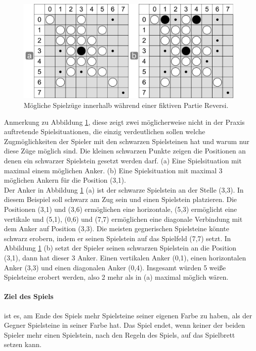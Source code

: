 \begin{figure}[!htbp]
  \centering
  \includegraphics[scale=0.5]{inhalt/abbildungen/zuege_schwarz_reversi.pdf}
  \caption{Mögliche Spielzüge innerhalb während einer fiktiven Partie Reversi.}
  \label{fig:zuege_schwarz_reversi}
\end{figure}

Anmerkung zu Abbildung \ref{fig:zuege_schwarz_reversi}, diese zeigt zwei möglicherweise nicht in der Praxis auftretende Spielsituationen, die einzig verdeutlichen sollen welche Zugmöglichkeiten der Spieler mit den schwarzen Spielsteinen hat und warum nur diese Züge möglich sind. Die kleinen schwarzen Punkte zeigen die Positionen an denen ein schwarzer Spielstein gesetzt werden darf. (a) Eine Spielsituation mit maximal einem möglichen Anker. (b) Eine Spielsituation mit maximal 3 möglichen Ankern für die Position (3,1). \\

Der Anker in Abbildung \ref{fig:zuege_schwarz_reversi} (a) ist der schwarze Spielstein an der Stelle (3,3). In diesem Beispiel soll schwarz am Zug sein und einen Spielstein platzieren. Die Positionen (3,1) und (3,6) ermöglichen eine horizontale, (5,3) ermöglicht eine vertikale und (5,1), (0,6) und (7,7) ermöglichen eine diagonale Verbindung mit dem Anker auf Position (3,3). Die meisten gegnerischen Spielsteine könnte schwarz erobern, indem er seinen Spielstein auf das Spielfeld (7,7) setzt. In Abbildung \ref{fig:zuege_schwarz_reversi} (b) setzt der Spieler seinen schwarzen Spielstein an die Position (3,1), dann hat dieser 3 Anker. Einen vertikalen Anker (0,1), einen horizontalen Anker (3,3) und einen diagonalen Anker (0,4). Insgesamt würden 5 weiße Spielsteine erobert werden, also 2 mehr als in (a) maximal möglich wären. \\

\paragraph{Ziel des Spiels} ist es, am Ende des Spiels mehr Spielsteine seiner eigenen Farbe zu haben, als der Gegner Spielsteine in seiner Farbe hat. Das Spiel endet, wenn keiner der beiden Spieler mehr einen Spielstein, nach den Regeln des Spiels, auf das Spielbrett setzen kann. \\

